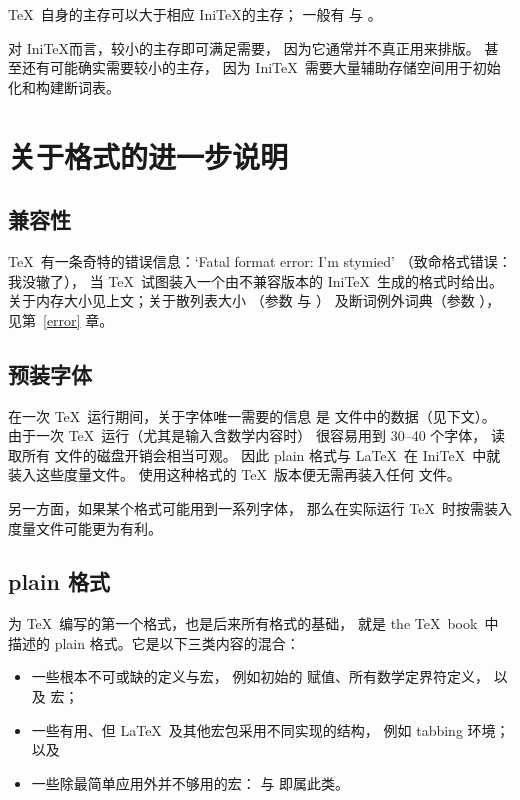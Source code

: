 \documentclass[a4paper]{rapport3}
\def\IniTeX{Ini\TeX}\def\LamsTeX{LAMS\TeX}\def\VirTeX{Vir\TeX}
\def\TeXbook{the \TeX\ book}\def\web{{\sc web}}
\begin{document}
\TeX\ 自身的主存可以大于相应 \IniTeX 的主存；
一般有  与 。

对 \IniTeX 而言，较小的主存即可满足需要，
因为它通常并不真正用来排版。
甚至还有可能确实需要较小的主存，
因为 \IniTeX\ 需要大量辅助存储空间用于初始化和构建断词表。


\section{关于格式的进一步说明}

\subsection{兼容性}

\TeX\ 有一条奇特的错误信息：`Fatal format error: I'm stymied'
（致命格式错误：我没辙了），
当 \TeX\ 试图装入一个由不兼容版本的 \IniTeX\ 生成的格式时给出。
关于内存大小见上文；关于散列表大小
（参数  与 ）
及断词例外词典（参数 ），见第~\ref{error} 章。

\subsection{预装字体}

在一次 \TeX\ 运行期间，关于字体唯一需要的信息
是  文件中的数据（见下文）。
由于一次 \TeX\ 运行（尤其是输入含数学内容时）
很容易用到 30--40 个字体，
读取所有  文件的磁盘开销会相当可观。
因此 plain 格式与 \LaTeX\ 在 \IniTeX\ 中就装入这些度量文件。
使用这种格式的 \TeX\ 版本便无需再装入任何  文件。

另一方面，如果某个格式可能用到一系列字体，
那么在实际运行 \TeX\ 时按需装入度量文件可能更为有利。

\subsection{plain 格式}

为 \TeX\ 编写的第一个格式，也是后来所有格式的基础，
就是 \TeXbook\ 中描述的 plain 格式。它是以下三类内容的混合：
\begin{itemize}
\item 一些根本不可或缺的定义与宏，
      例如初始的  赋值、所有数学定界符定义，
      以及  宏；
\item 一些有用、但 \LaTeX\ 及其他宏包采用不同实现的结构，
      例如 tabbing 环境；以及
\item 一些除最简单应用外并不够用的宏：
       与  即属此类。\end{itemize}
\end{document}
